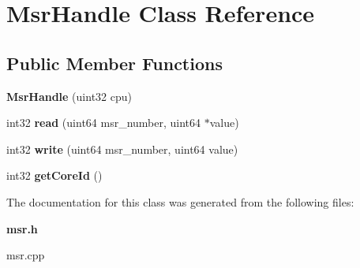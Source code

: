 \section{Msr\+Handle Class Reference}
\label{classMsrHandle}
\subsection*{Public Member Functions}
\begin{DoxyCompactItemize}
\item 
{\bfseries Msr\+Handle} (uint32 cpu)\label{classMsrHandle_a481b0c81ad8f00d9d69db660e793a135}

\item 
int32 {\bfseries read} (uint64 msr\+\_\+number, uint64 $\ast$value)\label{classMsrHandle_a9a7723baaa1ec91a8303b5ef6579c1df}

\item 
int32 {\bfseries write} (uint64 msr\+\_\+number, uint64 value)\label{classMsrHandle_aa92da3c093ca1473eb7a7cad86f24c89}

\item 
int32 {\bfseries get\+Core\+Id} ()\label{classMsrHandle_adbbfac37adfdd3fb571b5a6978f60419}

\end{DoxyCompactItemize}


The documentation for this class was generated from the following files\+:\begin{DoxyCompactItemize}
\item 
{\bf msr.\+h}\item 
msr.\+cpp\end{DoxyCompactItemize}
